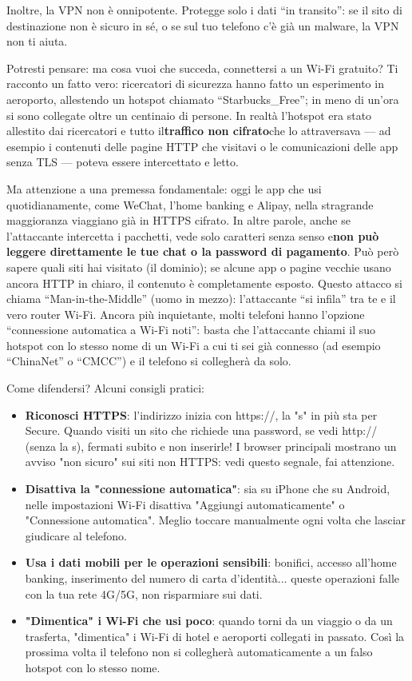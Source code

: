 Inoltre, la VPN non è onnipotente. Protegge solo i dati “in transito”: se il sito di destinazione non è sicuro in sé, o se sul tuo telefono c'è già un malware, la VPN non ti aiuta.


Potresti pensare: ma cosa vuoi che succeda, connettersi a un Wi-Fi gratuito? Ti racconto un fatto vero: ricercatori di sicurezza hanno fatto un esperimento in aeroporto, allestendo un hotspot chiamato “Starbucks\_Free”; in meno di un'ora si sono collegate oltre un centinaio di persone. In realtà l'hotspot era stato allestito dai ricercatori e tutto il\textbf{traffico non cifrato}che lo attraversava — ad esempio i contenuti delle pagine HTTP che visitavi o le comunicazioni delle app senza TLS — poteva essere intercettato e letto.

Ma attenzione a una premessa fondamentale: oggi le app che usi quotidianamente, come WeChat, l'home banking e Alipay, nella stragrande maggioranza viaggiano già in HTTPS cifrato. In altre parole, anche se l'attaccante intercetta i pacchetti, vede solo caratteri senza senso e\textbf{non può leggere direttamente le tue chat o la password di pagamento}. Può però sapere quali siti hai visitato (il dominio); se alcune app o pagine vecchie usano ancora HTTP in chiaro, il contenuto è completamente esposto. Questo attacco si chiama “Man-in-the-Middle” (uomo in mezzo): l'attaccante “si infila” tra te e il vero router Wi-Fi. Ancora più inquietante, molti telefoni hanno l'opzione “connessione automatica a Wi-Fi noti”: basta che l'attaccante chiami il suo hotspot con lo stesso nome di un Wi-Fi a cui ti sei già connesso (ad esempio “ChinaNet” o “CMCC”) e il telefono si collegherà da solo.

Come difendersi? Alcuni consigli pratici:

\begin{itemize}
  \item \textbf{Riconosci HTTPS}: l'indirizzo inizia con https://, la "s" in più sta per Secure. Quando visiti un sito che richiede una password, se vedi http:// (senza la s), fermati subito e non inserirle! I browser principali mostrano un avviso "non sicuro" sui siti non HTTPS: vedi questo segnale, fai attenzione.
  \item \textbf{Disattiva la "connessione automatica"}: sia su iPhone che su Android, nelle impostazioni Wi-Fi disattiva "Aggiungi automaticamente" o "Connessione automatica". Meglio toccare manualmente ogni volta che lasciar giudicare al telefono.
  \item \textbf{Usa i dati mobili per le operazioni sensibili}: bonifici, accesso all'home banking, inserimento del numero di carta d'identità... queste operazioni falle con la tua rete 4G/5G, non risparmiare sui dati.
  \item \textbf{"Dimentica" i Wi-Fi che usi poco}: quando torni da un viaggio o da un trasferta, "dimentica" i Wi-Fi di hotel e aeroporti collegati in passato. Così la prossima volta il telefono non si collegherà automaticamente a un falso hotspot con lo stesso nome.
\end{itemize}

